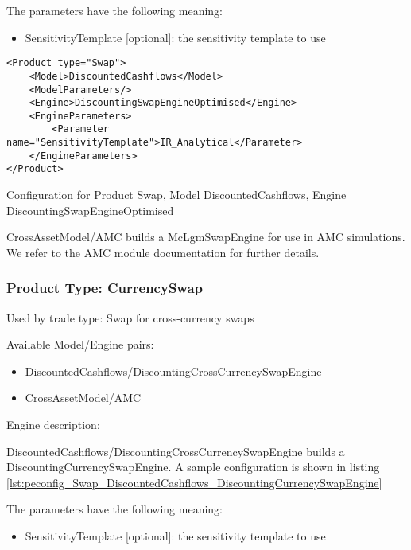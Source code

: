 The parameters have the following meaning:

\begin{itemize}
\item SensitivityTemplate [optional]: the sensitivity template to use 
\end{itemize}

\begin{longlisting}
\begin{verbatim}
<Product type="Swap">
    <Model>DiscountedCashflows</Model>
    <ModelParameters/>
    <Engine>DiscountingSwapEngineOptimised</Engine>
    <EngineParameters>
        <Parameter name="SensitivityTemplate">IR_Analytical</Parameter>
    </EngineParameters>
</Product>
\end{verbatim}
\caption{Configuration for Product Swap, Model DiscountedCashflows, Engine DiscountingSwapEngineOptimised}
\label{lst:peconfig_Swap_DiscountedCashflows_DiscountingSwapEngineOptimised}
\end{longlisting}

CrossAssetModel/AMC builds a McLgmSwapEngine for use in AMC simulations. We refer to the AMC module documentation for
further details.

\subsubsection{Product Type: CurrencySwap}

Used by trade type: Swap for cross-currency swaps

Available Model/Engine pairs:

\begin{itemize}
\item DiscountedCashflows/DiscountingCrossCurrencySwapEngine
\item CrossAssetModel/AMC
\end{itemize}

Engine description:

DiscountedCashflows/DiscountingCrossCurrencySwapEngine builds a DiscountingCurrencySwapEngine. A sample configuration is
shown in listing \ref{lst:peconfig_Swap_DiscountedCashflows_DiscountingCurrencySwapEngine}

The parameters have the following meaning:

\begin{itemize}
\item SensitivityTemplate [optional]: the sensitivity template to use 
\end{itemize}

